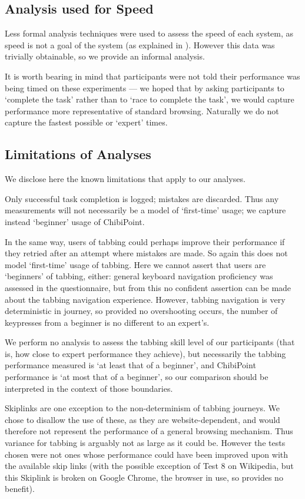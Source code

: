 \documentclass[11pt,openright,a4paper]{report}
\begin{document}
\subsection{Analysis used for Speed}
Less formal analysis techniques were used to assess the speed of each system, as speed is not a goal of the system (as explained in ). However this data was trivially obtainable, so we provide an informal analysis.

It is worth bearing in mind that participants were not told their performance was being timed on these experiments --- we hoped that by asking participants to `complete the task' rather than to `race to complete the task', we would capture performance more representative of standard browsing. Naturally we do not capture the fastest possible or `expert' times.

\subsection{Limitations of Analyses}
We disclose here the known limitations that apply to our analyses.

Only successful task completion is logged; mistakes are discarded. Thus any measurements will not necessarily be a model of `first-time' usage; we capture instead `beginner' usage of ChibiPoint.

In the same way, users of tabbing could perhaps improve their performance if they retried after an attempt where mistakes are made. So again this does not model `first-time' usage of tabbing. Here we cannot assert that users are `beginners' of tabbing, either: general keyboard navigation proficiency was assessed in the questionnaire, but from this no confident assertion can be made about the tabbing navigation experience. However, tabbing navigation is very deterministic in journey, so provided no overshooting occurs, the number of keypresses from a beginner is no different to an expert's.

We perform no analysis to assess the tabbing skill level of our participants (that is, how close to expert performance they achieve), but necessarily the tabbing performance measured is `at least that of a beginner', and ChibiPoint performance is `at most that of a beginner', so our comparison should be interpreted in the context of those boundaries.

Skiplinks are one exception to the non-determinism of tabbing journeys. We chose to disallow the use of these, as they are website-dependent, and would therefore not represent the performance of a general browsing mechanism. Thus variance for tabbing is arguably not as large as it could be. However the tests chosen were not ones whose performance could have been improved upon with the available skip links (with the possible exception of Test 8 on Wikipedia, but this Skiplink is broken on Google Chrome, the browser in use, so provides no benefit).
\end{document}

